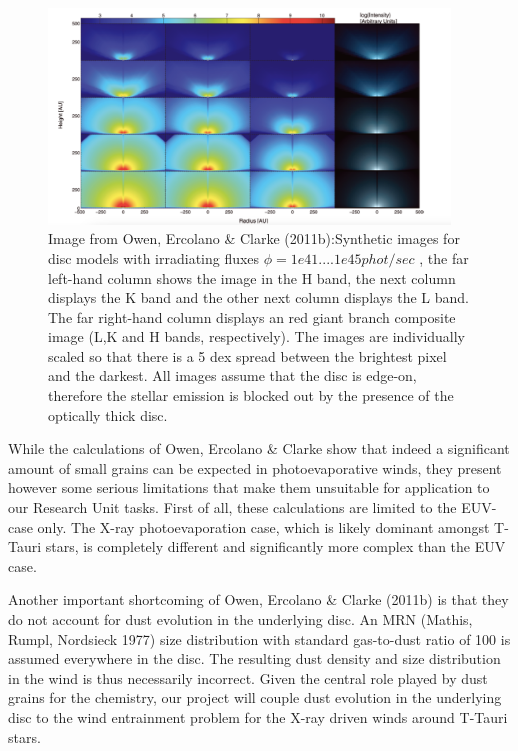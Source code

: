\documentclass[10pt,fleqn,twoside]{article}
\begin{document}
\begin{figure}
  \includegraphics[width=0.95\textwidth]{wingnut.pdf}
  \caption{Image from Owen, Ercolano \& Clarke (2011b):Synthetic
    images for disc models with irradiating fluxes $\phi =
    1e41.... 1e45 phot/sec$ , the far left-hand
    column shows the image in the H band, the next column displays the
    K band and the other next column displays the L band. The far
    right-hand column displays an red giant branch composite image
    (L,K and H bands, respectively). The images are individually
    scaled so that there is a 5 dex spread between the brightest pixel
    and the darkest. All images assume that the disc is edge-on,
    therefore the stellar emission is 
    blocked out by the presence of the optically thick disc.} 
  \label{fig:maps}
\end{figure}

While the calculations of Owen, Ercolano \& Clarke show that indeed a
significant amount of small grains can be expected in photoevaporative
winds, they present however
some serious limitations that make them unsuitable for application to our Research
Unit tasks. 
First of all, these calculations are limited to the EUV-case only. The
X-ray photoevaporation case, which is likely dominant amongst T-Tauri
stars, is completely different and significantly more complex than the EUV case. 

Another important shortcoming of Owen, Ercolano \& Clarke (2011b) is
that they do not account for dust evolution in the underlying disc. An
MRN (Mathis, Rumpl, Nordsieck 1977) size distribution with standard gas-to-dust ratio of 100 is
assumed everywhere in the disc. The resulting dust density and size
distribution in the wind is thus necessarily incorrect. Given the
central role played by dust grains for the chemistry, our project will
couple dust evolution in the underlying disc to the wind entrainment
problem for the X-ray driven winds around T-Tauri stars.  
\end{document}
